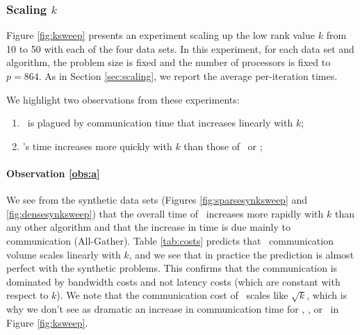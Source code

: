 \subsubsection{Scaling \texorpdfstring{$k$}{k}}
\label{sec:ksweep}

Figure \ref{fig:ksweep} presents an experiment scaling up the low rank value $k$ from 10 to 50 with each of the four data sets.
In this experiment, for each data set and algorithm, the problem size is fixed and the number of processors is fixed to $p=864$.
As in Section \ref{sec:scaling}, we report the average per-iteration times.

We highlight two observations from these experiments:
\begin{enumerate}
	\item \label{obs:a} \Naive\ is plagued by communication time that increases linearly with $k$;
	\item \label{obs:b} \BPP's time increases more quickly with $k$ than those of \MU\ or \HALS;
\end{enumerate}

\paragraph{Observation \ref{obs:a}} 
We see from the synthetic data sets (Figures \ref{fig:sparsesynksweep} and \ref{fig:densesynksweep}) that the overall time of \Naive\ increases more rapidly with $k$ than any other algorithm and that the increase in time is due mainly to communication (All-Gather).
Table \ref{tab:costs} predicts that \Naive\ communication volume scales linearly with $k$, and we see that in practice the prediction is almost perfect with the synthetic problems.
This confirms that the communication is dominated by bandwidth costs and not latency costs (which are constant with respect to $k$).
We note that the communication cost of \ParNMF\ scales like $\sqrt k$, which is why we don't see as dramatic an increase in communication time for \MU, \HALS, or \BPP\ in Figure \ref{fig:ksweep}.

